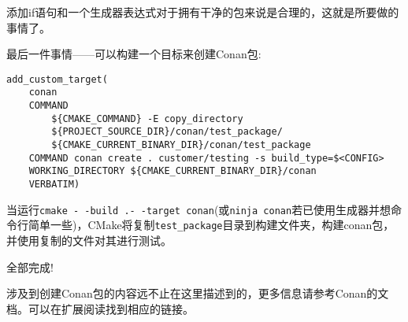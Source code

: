 添加if语句和一个生成器表达式对于拥有干净的包来说是合理的，这就是所要做的事情了。

最后一件事情——可以构建一个目标来创建Conan包:

\begin{lstlisting}[style=styleCMake]
add_custom_target(
	conan
	COMMAND
		${CMAKE_COMMAND} -E copy_directory
		${PROJECT_SOURCE_DIR}/conan/test_package/
		${CMAKE_CURRENT_BINARY_DIR}/conan/test_package
	COMMAND conan create . customer/testing -s build_type=$<CONFIG>
	WORKING_DIRECTORY ${CMAKE_CURRENT_BINARY_DIR}/conan
	VERBATIM)
\end{lstlisting}

当运行\texttt{cmake -\,-build .-\,-target conan}(或\texttt{ninja conan}若已使用生成器并想命令行简单一些)，CMake将复制\texttt{test\_package}目录到构建文件夹，构建conan包，并使用复制的文件对其进行测试。

全部完成!

\begin{tcolorbox}[colback=blue!5!white,colframe=blue!75!black, title=Note]
\hspace*{0.7cm}涉及到创建Conan包的内容远不止在这里描述到的，更多信息请参考Conan的文档。可以在扩展阅读找到相应的链接。
\end{tcolorbox}








